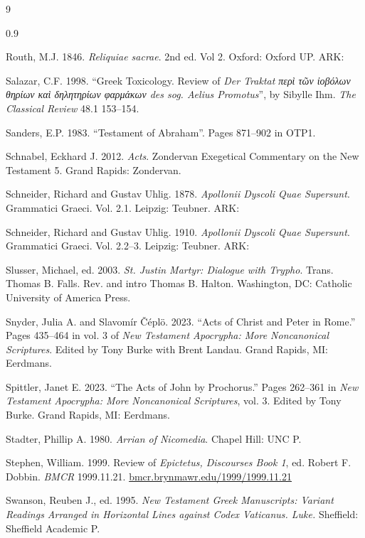 \begin{thebibliography}{9}
\begin{spacing}{0.9}
\begin{small}
Routh, M.J. 1846. %
\textit{Reliquiae sacrae}. %
2nd ed. Vol 2. %
Oxford: Oxford UP. %
ARK: 

Salazar, C.F. 1998. %
“Greek Toxicology. %
Review of \textit{Der Traktat περὶ τῶν ἰοβόλων θηρίων καὶ δηλητηρίων φαρμάκων des sog. Aelius Promotus}”, %
by Sibylle Ihm. %
\textit{The Classical Review} 48.1 153--154. %

Sanders, E.P. 1983. %
“Testament of Abraham”. %
Pages 871--902 in OTP1.

Schnabel, Eckhard J. 2012. %
\textit{Acts}. %
Zondervan Exegetical Commentary on the New Testament 5. %
Grand Rapids: Zondervan. %

Schneider, Richard and Gustav Uhlig. 1878. %
\textit{Apollonii Dyscoli Quae Supersunt}. %
Grammatici Graeci. Vol. 2.1. %
Leipzig: Teubner. %
ARK:  %

Schneider, Richard and Gustav Uhlig. 1910. %
\textit{Apollonii Dyscoli Quae Supersunt}. %
Grammatici Graeci. Vol. 2.2--3. %
Leipzig: Teubner. %
ARK:  %

Slusser, Michael, ed. 2003. %
\textit{St. Justin Martyr: Dialogue with Trypho}. %
Trans. Thomas B. Falls. Rev. and intro Thomas B. Halton. %
Washington, DC: Catholic University of America Press. %

Snyder, Julia A. and Slavomír Čéplö. 2023. %
“Acts of Christ and Peter in Rome.” %
Pages 435--464 in vol. 3 of \textit{New Testament Apocrypha: More Noncanonical Scriptures}. %
Edited by Tony Burke with Brent Landau. Grand Rapids, MI: Eerdmans. %

Spittler, Janet E. 2023. %
­“The Acts of John by Prochorus.” %
Pages 262–361 in \textit{New Testament Apocrypha: More Noncanonical Scriptures}, vol. 3. %
Edited by Tony Burke. %
Grand Rapids, MI: Eerdmans. %

Stadter, Phillip A. 1980. %
\textit{Arrian of Nicomedia}. %
Chapel Hill: UNC P. %

Stephen, William. 1999. %
Review of \textit{Epictetus, Discourses Book 1}, ed. Robert F. Dobbin. %
\textit{BMCR} 1999.11.21. %
\url{bmcr.brynmawr.edu/1999/1999.11.21} %

Swanson, Reuben J., ed. 1995. %
\textit{New Testament Greek Manuscripts: Variant Readings Arranged in Horizontal Lines against Codex Vaticanus. Luke.} %
Sheffield: Sheffield Academic P. %


\end{small}
\end{spacing}
\end{thebibliography}
